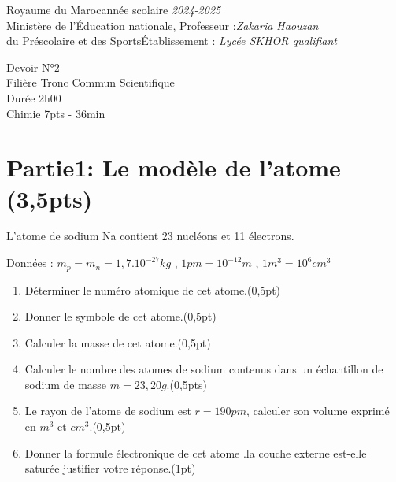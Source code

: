 \documentclass[12pt]{article}
\newcommand\headerMe[2]{\noindent{}#1\hfill#2}
\begin{document}
\headerMe{Royaume du Maroc}{année scolaire \emph{2024-2025}}\\
\headerMe{Ministère de l'Éducation nationale, }{  Professeur :\emph{Zakaria Haouzan}}\\
\headerMe{du Préscolaire et des Sports}{Établissement : \emph{Lycée SKHOR qualifiant}}\\

\begin{center}

	Devoir  N°2 \\
	Filière Tronc Commun Scientifique\\
	Durée 2h00
	\\
	\hrulefill
	\Large{Chimie 7pts - 36min}
	\hrulefill\\

\end{center}


\section*{Partie1: Le modèle de l'atome  \dotfill (3,5pts) }
L’atome de sodium Na contient 23 nucléons et 11
électrons.

Données : $m_p = m_n = 1,7.10^{-27}kg$ , $1pm = 10^{-12}m$ , $1m^3  =10^6 cm^3$

\begin{enumerate}

	\item Déterminer le numéro atomique de cet
	      atome.\dotfill(0,5pt)
	\item  Donner le symbole de cet atome.\dotfill(0,5pt)
	\item  Calculer la masse de cet atome.\dotfill(0,5pt)
	\item Calculer le nombre des atomes de sodium
	      contenus dans un échantillon de sodium
	      de masse $m=23,20g$.\dotfill(0,5pts)
	\item  Le rayon de l’atome de sodium est
	      $r=190pm$, calculer son volume exprimé en $m^3$ et $cm^3$.\dotfill(0,5pt)
	\item  Donner la formule électronique de cet
	      atome .la couche externe est-elle saturée
	      justifier votre réponse.\dotfill(1pt)
\end{enumerate}
\end{document}
